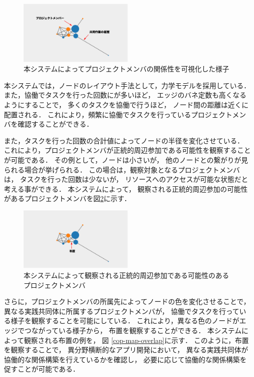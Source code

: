 \begin{figure}[h]
  \centering
  \includegraphics[width=0.5\textwidth]{img/cop-map-graph.eps}
  \caption{本システムによってプロジェクトメンバの関係性を可視化した様子}
  \label{cop-map-graph}
\end{figure}

本システムでは，ノードのレイアウト手法として，力学モデルを採用している．
また，協働でタスクを行った回数にが多いほど，
エッジのバネ定数も高くなるようにすることで，
多くのタスクを協働で行うほど，
ノード間の距離は近くに配置される．
これにより，頻繁に協働でタスクを行っているプロジェクトメンバを確認することができる．

また，タスクを行った回数の合計値によってノードの半径を変化させている．
これにより，プロジェクトメンバが正統的周辺参加である可能性を観察することが可能である．
その例として，ノードは小さいが，
他のノードとの繋がりが見られる場合が挙げられる．
この場合は，観察対象となるプロジェクトメンバは，
タスクを行った回数は少ないが，
リソースへのアクセスが可能な状態だと考える事ができる．
本システムによって，
観察される正統的周辺参加の可能性があるプロジェクトメンバを図\ref{cop-map-lpp}に示す．

\begin{figure}[h]
  \centering
  \includegraphics[width=0.5\textwidth]{img/cop-map-lpp.eps}
  \caption{本システムによって観察される正統的周辺参加である可能性のあるプロジェクトメンバ}
  \label{cop-map-lpp}
\end{figure}

さらに，プロジェクトメンバの所属先によってノードの色を変化させることで，
異なる実践共同体に所属するプロジェクトメンバが，
協働でタスクを行っている様子を観察することを可能にしている．
これにより，異なる色のノードがエッジでつながっている様子から，
布置を観察することができる．
本システムによって観察される布置の例を，
図 \ref{cop-map-overlap}に示す．
このように，布置を観察することで，
異分野横断的なアプリ開発において，
異なる実践共同体が協働的な関係構築を行えているかを確認し，
必要に応じて協働的な関係構築を促すことが可能である．

